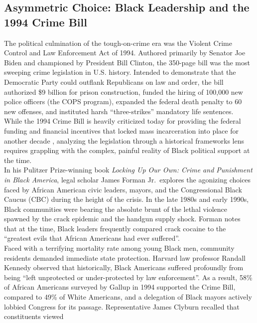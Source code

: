 \documentclass[
]{article}
\begin{document}
\subsection{\texorpdfstring{\textbf{Asymmetric Choice: Black Leadership
and the 1994 Crime
Bill}}{Asymmetric Choice: Black Leadership and the 1994 Crime Bill}}\label{asymmetric-choice-black-leadership-and-the-1994-crime-bill}

The political culmination of the tough-on-crime era was the Violent
Crime Control and Law Enforcement Act of 1994. Authored primarily by
Senator Joe Biden and championed by President Bill Clinton, the 350-page
bill was the most sweeping crime legislation in U.S. history. Intended
to demonstrate that the Democratic Party could outflank Republicans on
law and order, the bill authorized \$9 billion for prison construction,
funded the hiring of 100,000 new police officers (the COPS program),
expanded the federal death penalty to 60 new offenses, and instituted
harsh ``three-strikes'' mandatory life sentences.\\
While the 1994 Crime Bill is heavily criticized today for providing the
federal funding and financial incentives that locked mass incarceration
into place for another decade , analyzing the legislation through a
historical frameworks lens requires grappling with the complex, painful
reality of Black political support at the time.\\
In his Pulitzer Prize-winning book \emph{Locking Up Our Own: Crime and
Punishment in Black America}, legal scholar James Forman Jr.~explores
the agonizing choices faced by African American civic leaders, mayors,
and the Congressional Black Caucus (CBC) during the height of the
crisis. In the late 1980s and early 1990s, Black communities were
bearing the absolute brunt of the lethal violence spawned by the crack
epidemic and the handgun supply shock. Forman notes that at the time,
Black leaders frequently compared crack cocaine to the ``greatest evils
that African Americans had ever suffered''.\\
Faced with a terrifying mortality rate among young Black men, community
residents demanded immediate state protection. Harvard law professor
Randall Kennedy observed that historically, Black Americans suffered
profoundly from being ``left unprotected or under-protected by law
enforcement''. As a result, 58\% of African Americans surveyed by Gallup
in 1994 supported the Crime Bill, compared to 49\% of White Americans,
and a delegation of Black mayors actively lobbied Congress for its
passage. Representative James Clyburn recalled that constituents viewed
\end{document}
